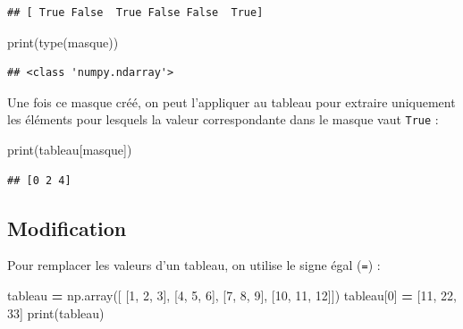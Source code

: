 \documentclass[
  12pt,
]{book}
\newenvironment{Shaded}{\begin{snugshade}}{\end{snugshade}}
\newcommand{\BuiltInTok}[1]{#1}
\newcommand{\DecValTok}[1]{\textcolor[rgb]{0.00,0.00,0.81}{#1}}
\newcommand{\NormalTok}[1]{#1}
\newcommand{\OperatorTok}[1]{\textcolor[rgb]{0.81,0.36,0.00}{\textbf{#1}}}
\numberwithin{equation}{section}
\numberwithin{countremarque}{section}
\begin{document}
\begin{lstlisting}
## [ True False  True False False  True]
\end{lstlisting}

\begin{Shaded}
\begin{Highlighting}[]
\BuiltInTok{print}\NormalTok{(}\BuiltInTok{type}\NormalTok{(masque))}
\end{Highlighting}
\end{Shaded}

\begin{lstlisting}
## <class 'numpy.ndarray'>
\end{lstlisting}

Une fois ce masque créé, on peut l'appliquer au tableau pour extraire uniquement les éléments pour lesquels la valeur correspondante dans le masque vaut \texttt{True} :

\begin{Shaded}
\begin{Highlighting}[]
\BuiltInTok{print}\NormalTok{(tableau[masque])}
\end{Highlighting}
\end{Shaded}

\begin{lstlisting}
## [0 2 4]
\end{lstlisting}

\subsection{Modification}\label{modification-3}

Pour remplacer les valeurs d'un tableau, on utilise le signe égal (\texttt{=}) :

\begin{Shaded}
\begin{Highlighting}[]
\NormalTok{tableau }\OperatorTok{=}\NormalTok{ np.array([ [}\DecValTok{1}\NormalTok{, }\DecValTok{2}\NormalTok{, }\DecValTok{3}\NormalTok{], [}\DecValTok{4}\NormalTok{, }\DecValTok{5}\NormalTok{, }\DecValTok{6}\NormalTok{], [}\DecValTok{7}\NormalTok{, }\DecValTok{8}\NormalTok{, }\DecValTok{9}\NormalTok{], [}\DecValTok{10}\NormalTok{, }\DecValTok{11}\NormalTok{, }\DecValTok{12}\NormalTok{]])}
\NormalTok{tableau[}\DecValTok{0}\NormalTok{] }\OperatorTok{=}\NormalTok{ [}\DecValTok{11}\NormalTok{, }\DecValTok{22}\NormalTok{, }\DecValTok{33}\NormalTok{]}
\BuiltInTok{print}\NormalTok{(tableau)}
\end{Highlighting}
\end{Shaded}
\end{document}
